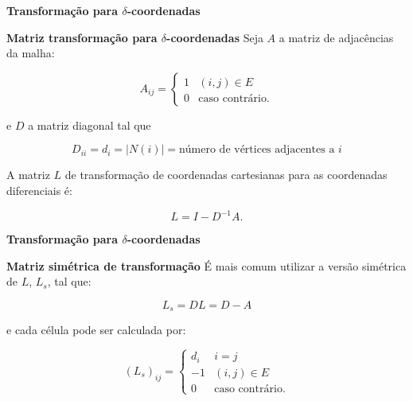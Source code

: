 \begin{frame}{{\bf \color{blue} Transformação para $\delta$-coordenadas}}
	
\begin{block}{\bf Matriz transformação para $\delta$-coordenadas}
	Seja $A$ a matriz de adjacências da malha:
	
	$$
	A_{ij} = \begin{cases}
	1&(i, j) \in E\\
	0&\text{caso contrário.}
	\end{cases}
	$$
	
	e $D$ a matriz diagonal tal que
	
	$$D_{ii} = d_{i} = |N(i)| = \text{número de vértices adjacentes a }i$$
	
	A matriz $L$ de transformação de coordenadas cartesianas para as coordenadas diferenciais é:
	
	\begin{equation}
	L = I - D^{-1}A.
	\end{equation}
	
\end{block}
	
\end{frame}



\begin{frame}{{\bf \color{blue} Transformação para $\delta$-coordenadas}}

\begin{block}{\bf Matriz simétrica de transformação}
	É mais comum utilizar a versão simétrica de $L$, $L_s$, tal que:
	
	$$L_s = DL = D - A$$
	
	e cada célula pode ser calculada por:
	
	\begin{equation}
	(L_s)_{ij} = \begin{cases}
	d_i&i=j\\
	-1&(i, j) \in E\\
	0&\text{caso contrário.}
	\end{cases}
	\end{equation}
	
\end{block}

\end{frame}


